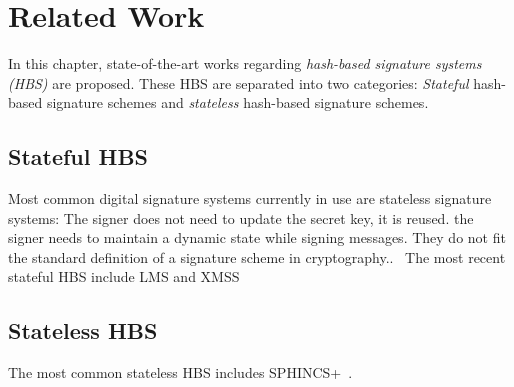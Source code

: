 \chapter{Related Work}
\label{cha:stateOfTheArt}

In this chapter, state-of-the-art works regarding \textit{hash-based signature systems (HBS)} are proposed. 
These HBS are separated into two categories: \textit{Stateful} hash-based signature schemes and \textit{stateless} hash-based signature schemes.  

\section{Stateful HBS}
Most common digital signature systems currently in use are stateless signature systems: The signer does not need to update the secret key, it is reused. 
the signer needs to maintain a dynamic state while signing messages. They do not fit the standard definition of a signature scheme in cryptography..~\cite{properties_stateless_HBS_2022}
The most recent stateful HBS include LMS and XMSS~\cite{stateful_hashbased_sign_schemes_NIST_2020}


\section{Stateless HBS}
The most common stateless HBS includes SPHINCS+~\cite{tweakable_basispaper_sphincs_2019}. 






